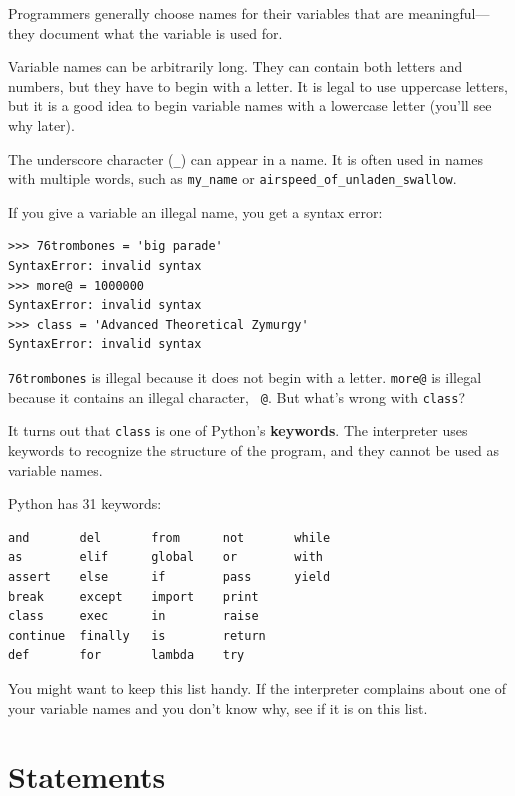 \documentclass[10pt]{book}
\begin{document}
Programmers generally choose names for their variables that
are meaningful---they document what the variable is used for.

Variable names can be arbitrarily long.  They can contain
both letters and numbers, but they have to begin with a letter.
It is legal to use uppercase letters, but it is a good idea
to begin variable names with a lowercase letter (you'll
see why later).

The underscore character (\verb"_") can appear in a name.
It is often used in names with multiple words, such as
\verb"my_name" or \verb"airspeed_of_unladen_swallow".


If you give a variable an illegal name, you get a syntax error:

\beforeverb
\begin{verbatim}
>>> 76trombones = 'big parade'
SyntaxError: invalid syntax
>>> more@ = 1000000
SyntaxError: invalid syntax
>>> class = 'Advanced Theoretical Zymurgy'
SyntaxError: invalid syntax
\end{verbatim}
\afterverb
%
{\tt 76trombones} is illegal because it does not begin with a letter.
{\tt more@} is illegal because it contains an illegal character, {\tt
@}.  But what's wrong with {\tt class}?

It turns out that {\tt class} is one of Python's {\bf keywords}.  The
interpreter uses keywords to recognize the structure of the program,
and they cannot be used as variable names.


Python has 31 keywords:

\beforeverb
\begin{verbatim}
and       del       from      not       while    
as        elif      global    or        with     
assert    else      if        pass      yield    
break     except    import    print              
class     exec      in        raise              
continue  finally   is        return             
def       for       lambda    try
\end{verbatim}
\afterverb
%
You might want to keep this list handy.  If the interpreter complains
about one of your variable names and you don't know why, see if it
is on this list.


\section{Statements}
\end{document}
